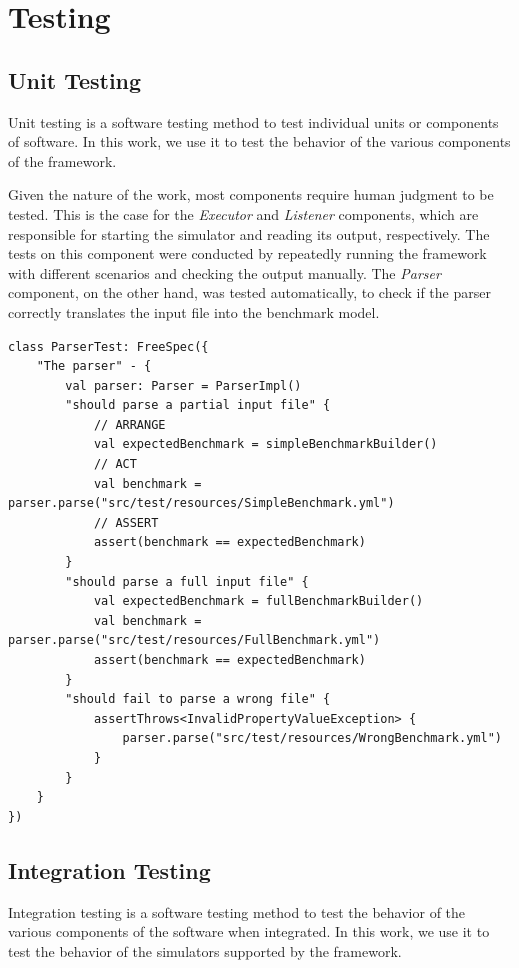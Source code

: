 \documentclass[12pt,a4paper,openright,twoside]{book}
\begin{document}
\section{Testing}

\subsection*{Unit Testing}
Unit testing is a software testing method to test individual units or components of software.
In this work, we use it to test the behavior of the various components of the framework.

Given the nature of the work, most components require human judgment to be tested. 
This is the case for the \emph{Executor} and \emph{Listener} components, which are responsible for starting the simulator and reading its output, respectively.
The tests on this component were conducted by repeatedly running the framework with different scenarios and checking the output manually.
The \emph{Parser} component, on the other hand, was tested automatically, to check if the parser correctly translates the input file into the benchmark model.

\begin{lstlisting}[style=my-kotlin, language=my-kotlin, caption={Parser tests.}]
  class ParserTest: FreeSpec({
    "The parser" - {
        val parser: Parser = ParserImpl()
        "should parse a partial input file" {
            // ARRANGE
            val expectedBenchmark = simpleBenchmarkBuilder()
            // ACT
            val benchmark = parser.parse("src/test/resources/SimpleBenchmark.yml")
            // ASSERT
            assert(benchmark == expectedBenchmark)
        }
        "should parse a full input file" {
            val expectedBenchmark = fullBenchmarkBuilder()
            val benchmark = parser.parse("src/test/resources/FullBenchmark.yml")
            assert(benchmark == expectedBenchmark)
        }
        "should fail to parse a wrong file" {
            assertThrows<InvalidPropertyValueException> {
                parser.parse("src/test/resources/WrongBenchmark.yml")
            }
        }
    }
})
\end{lstlisting}

\subsection*{Integration Testing}

Integration testing is a software testing method to test the behavior of the various components of the software when integrated.
In this work, we use it to test the behavior of the simulators supported by the framework.
\end{document}
